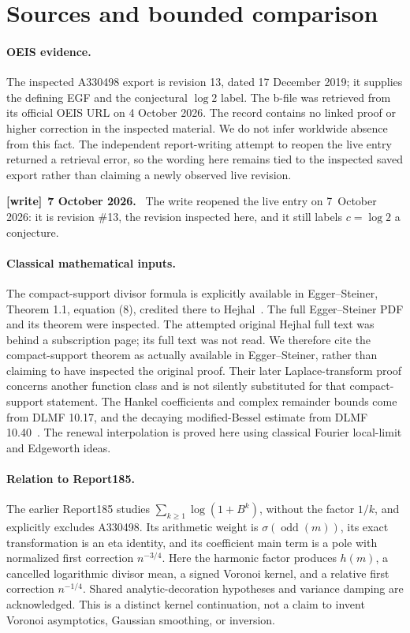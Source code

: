 \documentclass[11pt]{article}
\theoremstyle{definition}\newtheorem{definition}[theorem]{Definition}
\theoremstyle{remark}\newtheorem{remark}[theorem]{Remark}
\newcommand{\odd}{\operatorname{odd}}
\newenvironment{writenote}[1][]{\par\smallskip\begingroup\small
 \noindent\textbf{[write]}\if\relax\detokenize{#1}\relax\else~\textbf{#1.}\fi\ }%
 {\par\endgroup\smallskip}
\begin{document}
\section{Sources and bounded comparison}\label{dep:hl:sec:sources}
\paragraph{OEIS evidence.}
The inspected A330498 export is revision 13, dated 17 December 2019;
it supplies the defining EGF and the conjectural $\log2$ label. The
b-file was retrieved from its official OEIS URL on 4 October 2026.
The record contains no linked proof or higher correction in the
inspected material. We do not infer worldwide absence from this fact.
The independent report-writing attempt to reopen the live entry
returned a retrieval error, so the wording here remains tied to the
inspected saved export rather than claiming a newly observed live
revision.

\begin{writenote}[7 October 2026]
The write reopened the live entry on 7~October 2026: it is revision \#13, the revision inspected here, and it still labels $c=\log2$ a conjecture.
\end{writenote}

\paragraph{Classical mathematical inputs.}
The compact-support divisor formula is explicitly available in
Egger--Steiner, Theorem 1.1, equation (8), credited there to
Hejhal~\cite{voronoi}. The full Egger--Steiner PDF and its theorem
were inspected. The attempted original Hejhal full text was behind a
subscription page; its full text was not read. We therefore cite the
compact-support theorem as actually available in Egger--Steiner,
rather than claiming to have inspected the original proof. Their
later Laplace-transform proof concerns another function class and is
not silently substituted for that compact-support statement. The
Hankel coefficients and complex remainder bounds come from
DLMF 10.17, and the decaying modified-Bessel estimate from
DLMF 10.40~\cite{dlmfH,dlmfK}. The renewal interpolation is proved
here using classical Fourier local-limit and Edgeworth ideas.

\paragraph{Relation to Report185.}
The earlier Report185 studies $\sum_{k\ge1}\log(1+B^k)$, without the
factor $1/k$, and explicitly excludes A330498. Its arithmetic weight
is $\sigma(\odd(m))$, its exact transformation is an eta identity,
and its coefficient main term is a pole with normalized first
correction $n^{-3/4}$. Here the harmonic factor produces $h(m)$,
a cancelled logarithmic divisor mean, a signed Voronoi kernel, and a
relative first correction $n^{-1/4}$. Shared analytic-decoration
hypotheses and variance damping are acknowledged. This is a distinct
kernel continuation, not a claim to invent Voronoi asymptotics,
Gaussian smoothing, or inversion.
\end{document}
